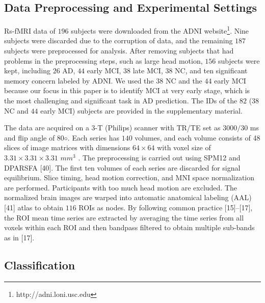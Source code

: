 \documentclass[journal]{IEEEtran}
\begin{document}
	\subsection{Data Preprocessing and Experimental Settings}
	
	Rs-fMRI data of $196$ subjects were downloaded from the ADNI website\footnote{http://adni.loni.usc.edu}. Nine subjects were discarded
	due to the corruption of data, and the remaining $187$ subjects were preprocessed for analysis. After removing subjects that had problems in the preprocessing steps, such as large head motion,
	$156$ subjects were kept, including $26$ AD, $44$ early MCI, $38$ late MCI, $38$ NC, and ten significant memory concern labeled by ADNI. We used the $38$ NC and the $44$ early MCI because our focus in this paper is to identify MCI at very early stage, which is the most challenging and significant task in AD
	prediction. The IDs of the $82$ ($38$ NC and $44$ early MCI) subjects are provided in the supplementary material. 
	
	The data are acquired on a $3$-T (Philips) scanner with TR/TE set as $3000/30$
	ms and flip angle of $80◦$. Each series has $140$ volumes, and each volume consists of 48 slices of image matrices with dimensions
	$64 \times 64$
	with voxel size of
	$ 3.31 \times  3.31 \times 3.31$
	$mm^3$ . The preprocessing is carried out using SPM12 and DPARSFA [40]. The
	first ten volumes of each series are discarded for signal equilibrium. Slice timing, head motion correction, and MNI space normalization are performed. Participants with too much head motion are excluded. The normalized brain images are warped into automatic anatomical labeling (AAL) [41] atlas to obtain $116$ ROIs as nodes. By following common practice [15]–[17], the ROI mean time series are extracted by averaging the time series from all voxels within each ROI and then bandpass filtered to obtain multiple sub-bands as in [17].
	
	
	
	\subsection{Classification}
	
\end{document}
